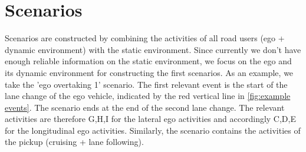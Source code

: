 \documentclass[10pt,final,a4paper,oneside,onecolumn]{article}
\theoremstyle{plain}\newtheorem{definition}{Definition}[section]    %
\theoremstyle{definition}\newtheorem{example}{Example}[section]     %
\theoremstyle{remark}\newtheorem{remarkenv}{Remark}[section]        %
\begin{document}
\section{Scenarios}

Scenarios are constructed by combining the activities of all road users (ego + dynamic environment) with the static environment. Since currently we don't have enough reliable information on the static environment, we focus on the ego and its dynamic environment for constructing the first scenarios. As an example, we take the 'ego overtaking 1' scenario. The first relevant event is the start of the lane change of the ego vehicle, indicated by the red vertical line in \cref{fig:example events}. The scenario ends at the end of the second lane change. The relevant activities are therefore G,H,I for the lateral ego activities and accordingly C,D,E for the longitudinal ego activities. Similarly, the scenario contains the activities of the pickup (cruising + lane following). 

\printbibliography
\end{document}
